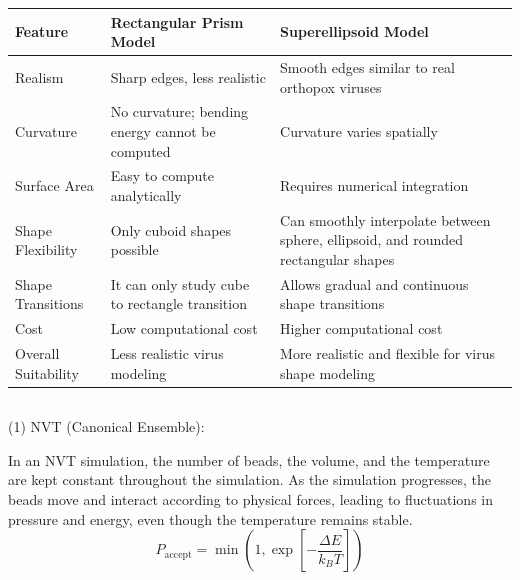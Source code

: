 \documentclass[12pt]{article}
\begin{document}
\begin{flushleft}
\begin{table}[h!]
\begin{tabular}{
>{\raggedright\arraybackslash}p{3.2cm}
>{\raggedright\arraybackslash}p{5.8cm}
>{\raggedright\arraybackslash}p{5.8cm}
}



\hline
Feature & Rectangular Prism Model & Superellipsoid Model \\
\hline
Realism 
& Sharp edges, less realistic 
& Smooth edges similar to real orthopox viruses \\

Curvature 
& No curvature; bending energy cannot be computed 
& Curvature varies spatially \\

Surface Area 
& Easy to compute analytically 
& Requires numerical integration \\

Shape Flexibility 
& Only cuboid shapes possible 
& Can smoothly interpolate between sphere, ellipsoid, and rounded rectangular shapes \\

Shape Transitions 
& It can only study cube to rectangle transition
& Allows gradual and continuous shape transitions \\

Cost 
& Low computational cost
& Higher  computational cost \\

Overall Suitability 
& Less realistic virus modeling 
& More realistic and flexible for virus shape modeling \\
\hline
\end{tabular}
\end{table}




\vspace{-1em} 
\subsection*{}

(1) NVT (Canonical Ensemble): 

In an NVT simulation, the number of beads, the volume, and the temperature are kept constant throughout the simulation.  As the simulation progresses, the beads move and interact according to physical forces, leading to fluctuations in pressure and energy, even though the temperature remains stable. 
\begin{equation}
P_{\text{accept}} = \min \left( 1, \exp\left[-\frac{\Delta E}{k_B T}\right] \right)
\end{equation}


\end{flushleft}
\end{document}
